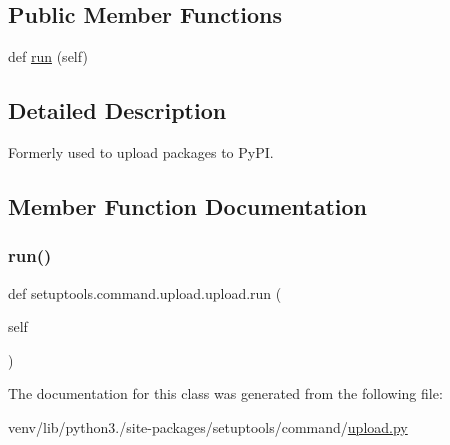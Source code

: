 \subsection*{Public Member Functions}
\begin{DoxyCompactItemize}
\item 
def \hyperlink{classsetuptools_1_1command_1_1upload_1_1upload_a049f7d1c27e1d3f7779e3b2615cdabcd}{run} (self)
\end{DoxyCompactItemize}


\subsection{Detailed Description}
\begin{DoxyVerb}Formerly used to upload packages to PyPI.\end{DoxyVerb}
 

\subsection{Member Function Documentation}
\mbox{\label{classsetuptools_1_1command_1_1upload_1_1upload_a049f7d1c27e1d3f7779e3b2615cdabcd}} 
\subsubsection{\texorpdfstring{run()}{run()}}
{\footnotesize\ttfamily def setuptools.\+command.\+upload.\+upload.\+run (\begin{DoxyParamCaption}\item[{}]{self }\end{DoxyParamCaption})}



The documentation for this class was generated from the following file\+:\begin{DoxyCompactItemize}
\item 
venv/lib/python3./site-\/packages/setuptools/command/\hyperlink{command_2upload_8py}{upload.\+py}\end{DoxyCompactItemize}
